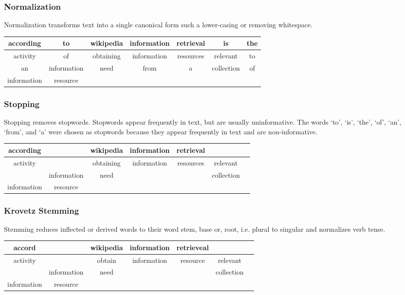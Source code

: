\subsubsection*{Normalization}
Normalization transforms text into a single canonical form such a lower-casing or removing whitespace.
\begin{center}
\begin{tabular}{| c | c | c | c | c | c | c |} \hline
according & to & wikipedia & information & retrieval & is & the \\ \hline
activity & of & obtaining & information & resources & relevant & to \\ \hline
an & information & need & from & a & collection & of \\ \hline
information & resource & & & & & \\ \hline
\end{tabular}
\end{center}

\subsubsection*{Stopping}
Stopping removes stopwords. Stopwords appear frequently in text, but are usually uninformative.
The words `to', `is', `the', `of', `an', `from', and `a' were chosen as stopwords because they appear frequently in text and are non-informative.

\begin{center} 
\begin{tabular}{| c | c | c | c | c | c | c |} \hline
according &  & wikipedia & information & retrieval &  &  \\ \hline
activity &  & obtaining & information & resources & relevant &  \\ \hline
 & information & need & &  & collection &  \\ \hline
information & resource & & & & & \\ \hline
\end{tabular}
\end{center}

\subsubsection*{Krovetz Stemming}
Stemming reduces inflected or derived words to their word stem, base or, root, i.e. plural to singular and normalizes verb tense.

\begin{center} 
\begin{tabular}{| c | c | c | c | c | c | c |} \hline
accord &  & wikipedia & information & retrieveal &  &    \\ \hline
activity &  & obtain & information & resource & relevant &    \\ \hline
 & information & need & &  & collection &    \\ \hline
information & resource & & & & &   \\ \hline
\end{tabular}
\end{center}

